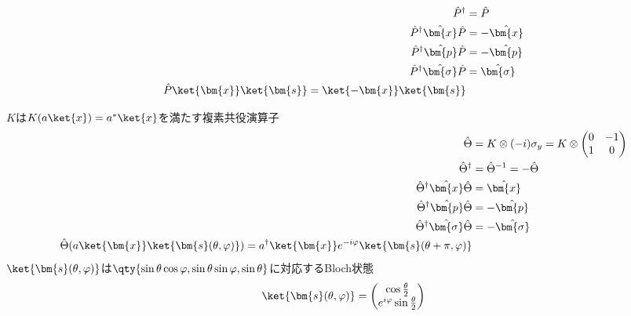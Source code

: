 \begin{deftcolorbox}[title = 空間反転演算子$\hat{P}$]
\begin{align*}
    \hat{P}^{\dagger} & = \hat{P}\\
    \hat{P}^{\dagger} \hat{\bm{x}} \hat{P} & = - \hat{\bm{x}}\\
    \hat{P}^{\dagger} \hat{\bm{p}} \hat{P} & = - \hat{\bm{p}}\\
    \hat{P}^{\dagger} \hat{\bm{\sigma}} \hat{P} & = \hat{\bm{\sigma}}\\
    \hat{P} \ket{\bm{x}} \ket{\bm{s}} = \ket{-\bm{x}} \ket{\bm{s}}
\end{align*}
\end{deftcolorbox}

\begin{deftcolorbox}[title = 時間反転演算子$\hat{\Theta}$]
$K$は$K(a\ket{x})=a^{\ast}\ket{x}$を満たす複素共役演算子
\begin{align*}
    \hat{\Theta} & = K \otimes (-i)\sigma_y = K \otimes \begin{pmatrix}0 & -1 \\ 1 & 0 \end{pmatrix}\\
    \hat{\Theta}^{\dagger} & = \hat{\Theta}^{-1} = -\hat{\Theta}\\
    \hat{\Theta}^{\dagger} \hat{\bm{x}} \hat{\Theta} & = \hat{\bm{x}}\\
    \hat{\Theta}^{\dagger} \hat{\bm{p}} \hat{\Theta} & = - \hat{\bm{p}}\\
    \hat{\Theta}^{\dagger} \hat{\bm{\sigma}} \hat{\Theta} & = - \hat{\bm{\sigma}}\\
    \hat{\Theta} (a\ket{\bm{x}} \ket{\bm{s}(\theta,\varphi)}) = a^{\dagger}\ket{\bm{x}} e^{-i\varphi} \ket{\bm{s}(\theta+\pi,\varphi)}
\end{align*}
$\ket{\bm{s}(\theta,\varphi)}$は$\qty{\sin \theta \cos \varphi, \sin \theta \sin \varphi, \sin \theta}$に対応するBloch状態
\begin{equation*}
    \ket{\bm{s}(\theta,\varphi)} = \begin{pmatrix} \cos \frac{\theta}{2} \\ e^{i\varphi} \sin \frac{\theta}{2} \end{pmatrix}
\end{equation*}
\end{deftcolorbox}